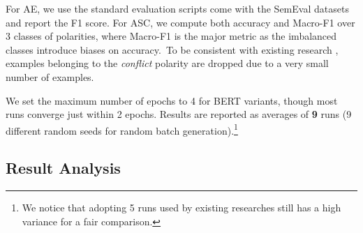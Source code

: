 \documentclass[11pt,a4paper]{article}
\begin{document}
For AE, we use the standard evaluation scripts come with the SemEval datasets and report the F1 score.
For ASC, 
we compute both accuracy and Macro-F1 over 3 classes of polarities, where Macro-F1 is the major metric as the imbalanced classes introduce biases on accuracy.~To be consistent with existing research \cite{tang2016aspect}, examples belonging to the \textit{conflict} polarity are dropped due to a very small number of examples.

We set the maximum number of epochs to 4 for BERT variants, though most runs converge just within 2 epochs.
Results are reported as averages of \textbf{9} runs (9 different random seeds for random batch generation).\footnote{We notice that adopting 5 runs used by existing researches still has a high variance for a fair comparison.} 

\subsection{Result Analysis}

\begin{table}
    \centering
	\caption{RRC in EM (Exact Match) and F1.}
\label{tbl:result_rc}
\vspace{-3mm}
\end{table}
\end{document}
